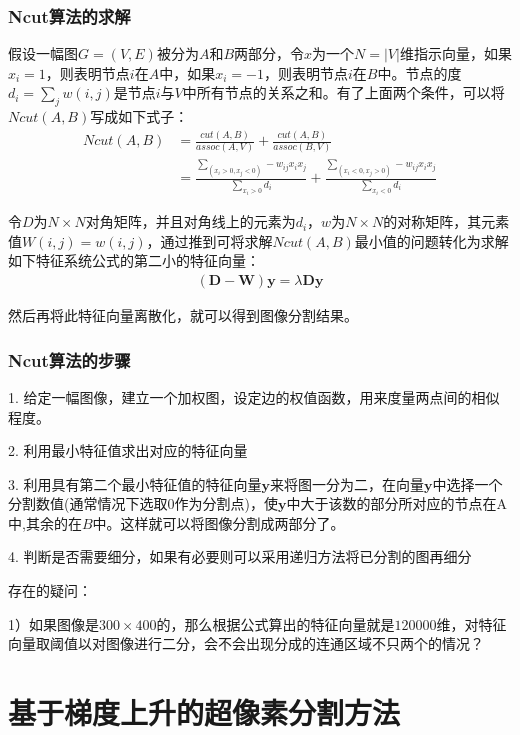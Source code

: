 \documentclass[12pt]{article}
\begin{document}
\subsubsection{Ncut算法的求解}

假设一幅图$G = (V, E)$被分为$A$和$B$两部分，令$x$为一个$N = |V|$维指示向量，如果$x_i = 1$，则表明节点$i$在$A$中，如果$x_i= -1$，则表明节点$i$在$B$中。节点的度$d_i = \sum_j w(i, j)$是节点$i$与$V$中所有节点的关系之和。有了上面两个条件，可以将$Ncut(A, B)$写成如下式子：
\begin{align}
Ncut(A, B) & = \frac{cut(A, B)}{assoc(A, V)} + \frac{cut(A, B)}{assoc(B, V)} \nonumber \\
& = \frac{\sum_{(x_i>0, x_j<0)} -w_{ij}x_i x_j}{\sum_{x_i>0}d_i} + \frac{\sum_{(x_i<0, x_j>0)} -w_{ij}x_i x_j}{\sum_{x_i<0}d_i}
\end{align}

令$D$为$N \times N$对角矩阵，并且对角线上的元素为$d_i$，$w$为$N \times N$的对称矩阵，其元素值$W(i, j) = w(i, j)$，通过推到可将求解$Ncut(A, B)$最小值的问题转化为求解如下特征系统公式的第二小的特征向量：
\begin{align}
(\mathbf{D} - \mathbf{W})\mathbf{y} = \lambda \mathbf{Dy}
\end{align}

然后再将此特征向量离散化，就可以得到图像分割结果。

\subsubsection{Ncut算法的步骤}

1. 给定一幅图像，建立一个加权图，设定边的权值函数，用来度量两点间的相似程度。

2. 利用最小特征值求出对应的特征向量

3. 利用具有第二个最小特征值的特征向量$\mathbf{y}$来将图一分为二，在向量$\mathbf{y}$中选择一个分割数值(通常情况下选取0作为分割点)，使$\mathbf{y}$中大于该数的部分所对应的节点在A中,其余的在$B$中。这样就可以将图像分割成两部分了。

4. 判断是否需要细分，如果有必要则可以采用递归方法将已分割的图再细分

存在的疑问：

1）如果图像是$300 \times 400$的，那么根据公式算出的特征向量就是$120000$维，对特征向量取阈值以对图像进行二分，会不会出现分成的连通区域不只两个的情况？

\section{基于梯度上升的超像素分割方法}
\end{document}
